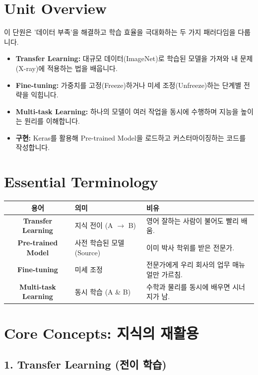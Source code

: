 \documentclass[11pt,a4paper]{book}
\theoremstyle{definition}
\begin{document}
\section{Unit Overview}
\begin{summarybox}[title={핵심 목표}]
이 단원은 '데이터 부족'을 해결하고 학습 효율을 극대화하는 두 가지 패러다임을 다룹니다.
\begin{itemize}
    \item \textbf{Transfer Learning:} 대규모 데이터(ImageNet)로 학습된 모델을 가져와 내 문제(X-ray)에 적용하는 법을 배웁니다.
    \item \textbf{Fine-tuning:} 가중치를 고정(Freeze)하거나 미세 조정(Unfreeze)하는 단계별 전략을 익힙니다.
    \item \textbf{Multi-task Learning:} 하나의 모델이 여러 작업을 동시에 수행하며 지능을 높이는 원리를 이해합니다.
    \item \textbf{구현:} Keras를 활용해 Pre-trained Model을 로드하고 커스터마이징하는 코드를 작성합니다.
\end{itemize}
\end{summarybox}

\section{Essential Terminology}
\begin{center}
\begin{tabular}{|c|l|l|}
\hline
\textbf{용어} & \textbf{의미} & \textbf{비유} \\ \hline
\textbf{Transfer Learning} & 지식 전이 (A $\to$ B) & 영어 잘하는 사람이 불어도 빨리 배움. \\ \hline
\textbf{Pre-trained Model} & 사전 학습된 모델 (Source) & 이미 박사 학위를 받은 전문가. \\ \hline
\textbf{Fine-tuning} & 미세 조정 & 전문가에게 우리 회사의 업무 매뉴얼만 가르침. \\ \hline
\textbf{Multi-task Learning} & 동시 학습 (A \& B) & 수학과 물리를 동시에 배우면 시너지가 남. \\ \hline
\end{tabular}
\end{center}

\section{Core Concepts: 지식의 재활용}

\subsection{1. Transfer Learning (전이 학습)}
\end{document}
